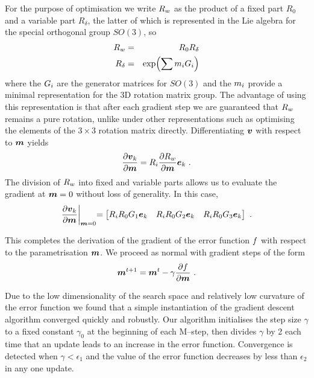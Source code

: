 For the purpose of optimisation we write $\SceneR$ as the product of a
fixed part $R_0$ and a variable part $R_{\delta}$, the latter of which
is represented in the Lie algebra for the special orthogonal group
$SO(3)$, so
\begin{eqnarray}
  \SceneR &=& R_0 R_{\delta} \\
  R_{\delta} &=& \exp\Bigl(\sum \LieM_i \Gen_i\Bigr)
\end{eqnarray}
where the $\Gen_i$ are the generator matrices for $SO(3)$ and the
$\LieM_i$ provide a minimal representation for the 3D rotation matrix
group. The advantage of using this representation is that after each
gradient step we are guaranteed that $\SceneR$ remains a pure
rotation, unlike under other representations such as optimising the
elements of the $3 \times 3$ rotation matrix directly. Differentiating
$\vpt$ with respect to $\LieMs$ yields
\begin{equation}
  \Deriv{\vpt_k}{\LieMs} = \CamR_i \Deriv{\SceneR}{\LieMs} \ebasis_k ~.
\end{equation}
The division of $\SceneR$ into fixed and variable parts allows us to
evaluate the gradient at $\LieMs=0$ without loss of generality. In
this case,
\begin{equation}
  \Deriv{\vpt_k}{\LieMs} \EvalAt{\LieMs=0} =
  \begin{bmatrix}
    \CamR_i R_0 \Gen_1 \ebasis_k &
    \CamR_i R_0 \Gen_2 \ebasis_k &
    \CamR_i R_0 \Gen_3 \ebasis_k
  \end{bmatrix}~.
\end{equation}

This completes the derivation of the gradient of the error function
$\ErrorFunc$ with respect to the parametrisation $\LieMs$. We proceed as
normal with gradient steps of the form
\begin{equation}
  \LieMs^{t+1} = \LieMs^t - \gamma \Deriv{\ErrorFunc}{\LieMs} ~.
\end{equation}

Due to the low dimensionality of the search space and relatively low
curvature of the error function we found that a simple instantiation
of the gradient descent algorithm converged quickly and robustly. Our
algorithm initialises the step size $\gamma$ to a fixed constant
$\gamma_0$ at the beginning of each M--step, then divides $\gamma$ by
2 each time that an update leads to an increase in the error
function. Convergence is detected when $\gamma<\epsilon_1$ and the
value of the error function decreases by less than $\epsilon_2$ in any
one update.

